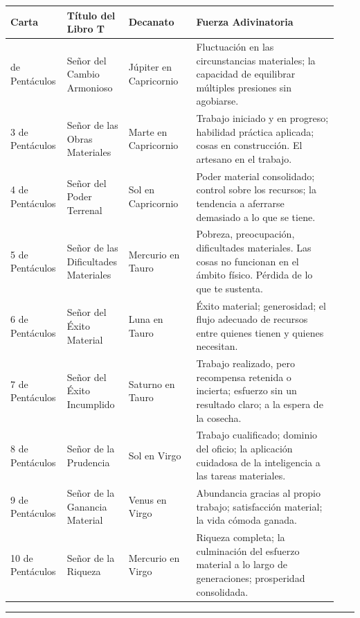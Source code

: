 \begin{longtable}[]{@{}>{\RaggedRight\small}p{0.14\linewidth}>{\RaggedRight\small}p{0.18\linewidth}>{\RaggedRight\small}p{0.20\linewidth}>{\RaggedRight\small}p{0.42\linewidth}@{}}
\toprule\noalign{}
Carta & Título del Libro T & Decanato & Fuerza Adivinatoria \\
\midrule\noalign{}
\endhead
\bottomrule\noalign{}
\endlastfoot
2 de Pentáculos & Señor del Cambio Armonioso & Júpiter en Capricornio & Fluctuación en las circunstancias materiales; la capacidad de equilibrar múltiples presiones sin agobiarse. \\
3 de Pentáculos & Señor de las Obras Materiales & Marte en Capricornio & Trabajo iniciado y en progreso; habilidad práctica aplicada; cosas en construcción. El artesano en el trabajo. \\
4 de Pentáculos & Señor del Poder Terrenal & Sol en Capricornio & Poder material consolidado; control sobre los recursos; la tendencia a aferrarse demasiado a lo que se tiene. \\
5 de Pentáculos & Señor de las Dificultades Materiales & Mercurio en Tauro & Pobreza, preocupación, dificultades materiales. Las cosas no funcionan en el ámbito físico. Pérdida de lo que te sustenta. \\
6 de Pentáculos & Señor del Éxito Material & Luna en Tauro & Éxito material; generosidad; el flujo adecuado de recursos entre quienes tienen y quienes necesitan. \\
7 de Pentáculos & Señor del Éxito Incumplido & Saturno en Tauro & Trabajo realizado, pero recompensa retenida o incierta; esfuerzo sin un resultado claro; a la espera de la cosecha. \\
8 de Pentáculos & Señor de la Prudencia & Sol en Virgo & Trabajo cualificado; dominio del oficio; la aplicación cuidadosa de la inteligencia a las tareas materiales. \\
9 de Pentáculos & Señor de la Ganancia Material & Venus en Virgo & Abundancia gracias al propio trabajo; satisfacción material; la vida cómoda ganada. \\
10 de Pentáculos & Señor de la Riqueza & Mercurio en Virgo & Riqueza completa; la culminación del esfuerzo material a lo largo de generaciones; prosperidad consolidada. \\
\end{longtable}

\begin{center}\rule{0.5\linewidth}{0.5pt}\end{center}

